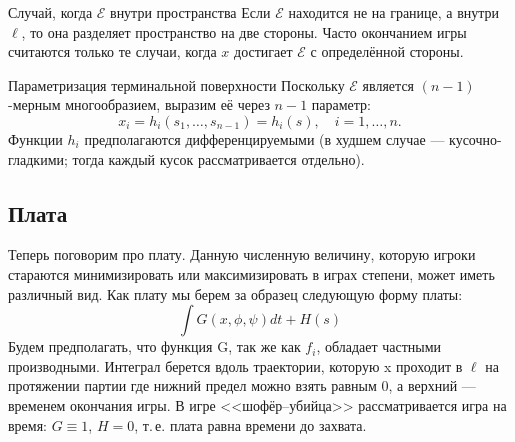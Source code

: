 \documentclass[14pt,a4paper]{extarticle}
\begin{document}
	Случай, когда \( \mathcal{E} \) внутри пространства
	Если \( \mathcal{E} \) находится не на границе, а внутри \( \ell \), то она разделяет пространство на две стороны. Часто окончанием игры считаются только те случаи, когда \( x \) достигает \( \mathcal{E} \) с определённой стороны.
	
	Параметризация терминальной поверхности
	Поскольку \( \mathcal{E} \) является \( (n-1) \)-мерным многообразием, выразим её через \( n-1 \) параметр:
	\[
	x_i = h_i(s_1, \dots, s_{n-1}) = h_i(s), \quad i = 1, \dots, n.
	\]
	Функции \( h_i \) предполагаются дифференцируемыми (в худшем случае — кусочно-гладкими; тогда каждый кусок рассматривается отдельно).
	
	\subsection{Плата}
	Теперь поговорим про плату. Данную численную величину, которую игроки стараются минимизировать или максимизировать в играх степени, может иметь различный вид. Как плату мы берем за образец следующую форму платы:
	\[\int G(x, \phi, \psi)dt + H(s)\] 
	Будем предполагать, что функция G, так же как $f_i$, обладает частными производными. Интеграл берется вдоль траектории, которую x проходит в $\ell$ на протяжении партии где нижний предел можно взять равным 0, а верхний --- временем окончания игры. В игре <<шофёр--убийца>> рассматривается игра на время: $G\equiv 1$, $H=0$, т.\,е. плата равна времени до захвата.
	
\end{document}
